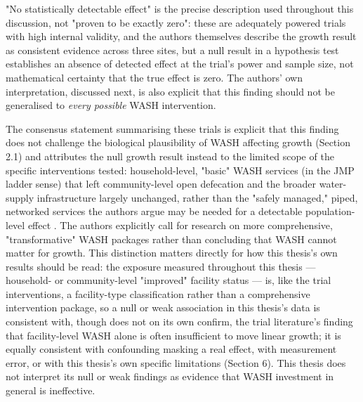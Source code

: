 "No statistically detectable effect" is the precise description used throughout this discussion, not "proven to be exactly zero": these are adequately powered trials with high internal validity, and the authors themselves describe the growth result as consistent evidence across three sites, but a null result in a hypothesis test establishes an absence of detected effect at the trial's power and sample size, not mathematical certainty that the true effect is zero. The authors' own interpretation, discussed next, is also explicit that this finding should not be generalised to \textit{every possible} WASH intervention.

The consensus statement summarising these trials is explicit that this finding does not challenge the biological plausibility of WASH affecting growth (Section 2.1) and attributes the null growth result instead to the limited scope of the specific interventions tested: household-level, "basic" WASH services (in the JMP ladder sense) that left community-level open defecation and the broader water-supply infrastructure largely unchanged, rather than the "safely managed," piped, networked services the authors argue may be needed for a detectable population-level effect \parencite{Cumming2019}. The authors explicitly call for research on more comprehensive, "transformative" WASH packages rather than concluding that WASH cannot matter for growth. This distinction matters directly for how this thesis's own results should be read: the exposure measured throughout this thesis --- household- or community-level "improved" facility status --- is, like the trial interventions, a facility-type classification rather than a comprehensive intervention package, so a null or weak association in this thesis's data is consistent with, though does not on its own confirm, the trial literature's finding that facility-level WASH alone is often insufficient to move linear growth; it is equally consistent with confounding masking a real effect, with measurement error, or with this thesis's own specific limitations (Section 6). This thesis does not interpret its null or weak findings as evidence that WASH investment in general is ineffective.

